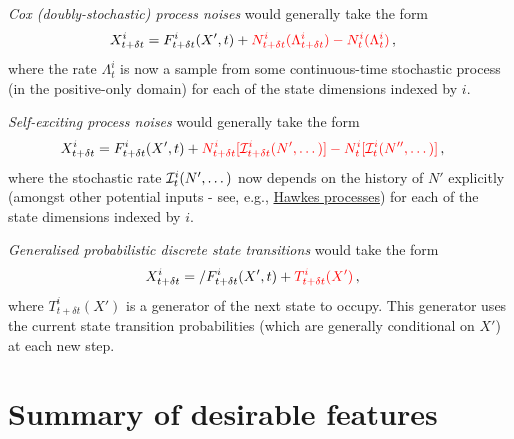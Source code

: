 \documentclass{book}
\begin{document}
\emph{Cox (doubly-stochastic) process noises} would generally take the form
\begin{align}
& X^i_{t+\delta t} = F^i_{t+\delta t}(X', t) + \textcolor{red}{N^i_{t+\delta t}({\Lambda^i_{t+\delta t}})-N^i_{t}({\Lambda^i_{t}})}\,,
\end{align}
where the rate $\Lambda^i_{t}$ is now a sample from some continuous-time stochastic process (in the positive-only domain) for each of the state dimensions indexed by $i$.

\emph{Self-exciting process noises} would generally take the form
\begin{align}
& X^i_{t+\delta t} = F^i_{t+\delta t}(X', t) + \textcolor{red}{N^i_{t+\delta t}[{\cal I}^i_{t+\delta t}(N', \dots)]-N^i_{t}[{\cal I}^i_{t}(N'', \dots)]}\,,
\end{align}
where the stochastic rate ${\cal I}^i_{t}(N', \dots)$ now depends on the history of $N'$ explicitly (amongst other potential inputs - see, e.g., \href{https://en.wikipedia.org/wiki/Hawkes_process}{Hawkes processes}) for each of the state dimensions indexed by $i$.

\emph{Generalised probabilistic discrete state transitions} would take the form
\begin{align}
& X^i_{t+\delta t} = \slash{F^i_{t+\delta t}(X', t)} + \textcolor{red}{T^i_{t+\delta t}(X')}\,,
\end{align}
where $T^i_{t+\delta t}(X')$ is a generator of the next state to occupy. This generator uses the current state transition probabilities (which are generally conditional on $X'$) at each new step.

\section{\sffamily Summary of desirable features}
\end{document}
